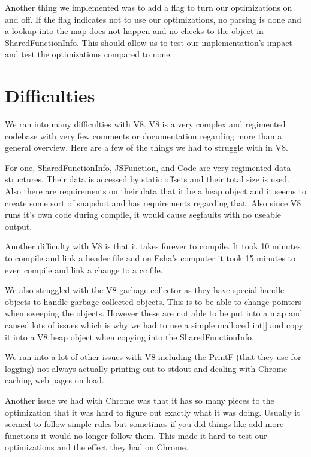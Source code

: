 \documentclass[twocolumn,showpacs,%
  nofootinbib,aps,superscriptaddress,%
  eqsecnum,prd,notitlepage,showkeys,10pt]{revtex4-1}
\begin{document}
Another thing we implemented was to add a flag to turn our optimizations on and off. If the flag indicates not to use our optimizations, no parsing is done and a lookup into the map does not happen and no checks to the object in SharedFunctionInfo. This should allow us to test our implementation's impact and test the optimizations compared to none.

\section {Difficulties}
We ran into many difficulties with V8. V8 is a very complex and regimented codebase with very few comments or documentation regarding more than a general overview. Here are a few of the things we had to struggle with in V8.

For one, SharedFunctionInfo, JSFunction, and Code are very regimented data structures. Their data is  accessed by static offsets and their total size is used. Also there are requirements on their data that it be a heap object and it seems to create some sort of snapshot and has requirements regarding that. Also since V8 runs it's own code during compile, it would cause segfaults with no useable output.

Another difficulty with V8 is that it takes forever to compile. It took 10 minutes to compile and link a header file and on Esha's computer it took 15 minutes to even compile and link a change to a cc file.

We also struggled with the V8 garbage collector as they have special handle objects to handle garbage collected objects. This is to be able to change pointers when sweeping the objects. However these are not able to be put into a map and caused lots of issues which is why we had to use a simple malloced int[] and copy it into a V8 heap object when copying into the SharedFunctionInfo. 

We ran into a lot of other issues with V8 including the PrintF (that they use for logging) not always actually printing out to stdout and dealing with Chrome caching web pages on load. 

Another issue we had with Chrome was that it has so many pieces to the optimization that it was hard to figure out exactly what it was doing. Usually it seemed to follow simple rules but sometimes if you did things like add more functions it would no longer follow them. This made it hard to test our optimizations and the effect they had on Chrome.
\end{document}

